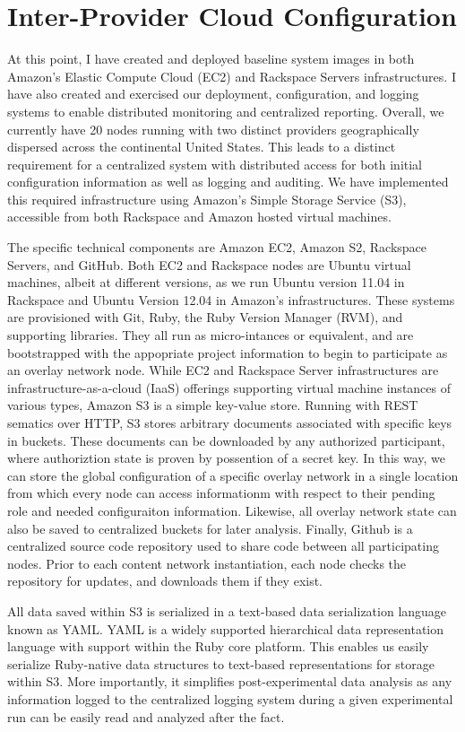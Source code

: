 \section{Inter-Provider Cloud Configuration}
At this point, I have created and deployed baseline system images in both Amazon's Elastic Compute Cloud (EC2) and Rackspace Servers infrastructures.  I have also created and exercised our deployment, configuration, and logging systems to enable distributed monitoring and centralized reporting.  Overall, we currently have 20 nodes running with two distinct providers geographically dispersed across the continental United States.  This leads to a distinct requirement for a centralized system with distributed access for both initial configuration information as well as logging and auditing.  We have implemented this required infrastructure using Amazon's Simple Storage Service (S3), accessible from both Rackspace and Amazon hosted virtual machines.

The specific technical components are Amazon EC2, Amazon S2, Rackspace Servers, and GitHub.  Both EC2 and Rackspace nodes are Ubuntu virtual machines, albeit at different versions, as we run Ubuntu version 11.04 in Rackspace and Ubuntu Version 12.04 in Amazon's infrastructures.  These systems are provisioned with Git, Ruby, the Ruby Version Manager (RVM), and supporting libraries.  They all run as micro-intances or equivalent, and are bootstrapped with the appopriate project information to begin to participate as an overlay network node.  While EC2 and Rackspace Server infrastructures are infrastructure-as-a-cloud (IaaS) offerings supporting virtual machine instances of various types, Amazon S3 is a simple key-value store.  Running with REST sematics over HTTP, S3 stores arbitrary documents associated with specific keys in buckets.  These documents can be downloaded by any authorized participant, where authoriztion state is proven by possention of a secret key.  In this way, we can store the global configuration of a specific overlay network in a single location from which every node can access informationm with respect to their pending role and needed configuraiton information.  Likewise, all overlay network state can also be saved to centralized buckets for later analysis.  Finally, Github is a centralized source code repository used to share code between all participating nodes.  Prior to each content network instantiation, each node checks the repository for updates, and downloads them if they exist.

All data saved within S3 is serialized in a text-based data serialization language known as YAML.  YAML is a widely supported hierarchical data representation language with support within the Ruby core platform.  This enables us easily serialize Ruby-native data structures to text-based representations for storage within S3.  More importantly, it simplifies post-experimental data analysis as any information logged to the centralized logging system during a given experimental run can be easily read and analyzed after the fact.

